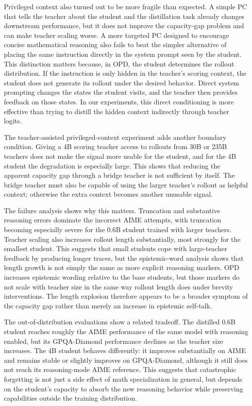 Privileged context also turned out to be more fragile than expected. A simple PC that tells the teacher about the student and the distillation task already changes downstream performance, but it does not improve the capacity-gap problem and can make teacher scaling worse. A more targeted PC designed to encourage concise mathematical reasoning also fails to beat the simpler alternative of placing the same instruction directly in the system prompt seen by the student. This distinction matters because, in OPD, the student determines the rollout distribution. If the instruction is only hidden in the teacher's scoring context, the student does not generate its rollout under the desired behavior. Direct system prompting changes the states the student visits, and the teacher then provides feedback on those states. In our experiments, this direct conditioning is more effective than trying to distill the hidden context indirectly through teacher logits.

The teacher-assisted privileged-context experiment adds another boundary condition. Giving a 4B scoring teacher access to rollouts from 30B or 235B teachers does not make the signal more usable for the student, and for the 4B student the degradation is especially large. This shows that reducing the apparent capacity gap through a bridge teacher is not sufficient by itself. The bridge teacher must also be capable of using the larger teacher's rollout as helpful context; otherwise the extra context becomes another unusable signal.

The failure analysis shows why this matters. Truncation and substantive reasoning errors dominate the incorrect AIME attempts, with truncation becoming especially severe for the 0.6B student trained with larger teachers. Teacher scaling also increases rollout length substantially, most strongly for the smallest student. This suggests that small students cope with large-teacher feedback by producing longer traces, but the epistemic-word analysis shows that length growth is not simply the same as more explicit reasoning markers. OPD increases epistemic wording relative to the base students, but those markers do not scale with teacher size in the same way rollout length does under brevity interventions. The length explosion therefore appears to be a broader symptom of the capacity gap rather than merely an increase in epistemic self-talk.

The out-of-distribution evaluations show a related tradeoff. The distilled 0.6B student reaches roughly the AIME performance of the same model with reasoning enabled, but its GPQA-Diamond performance declines as the teacher size increases. The 4B student behaves differently: it improves substantially on AIME and remains stable or slightly improves on GPQA-Diamond, although it still does not reach its reasoning-mode AIME reference. This suggests that catastrophic forgetting is not just a side effect of math specialization in general, but depends on the student's capacity to absorb the new reasoning behavior while preserving capabilities outside the training distribution.

